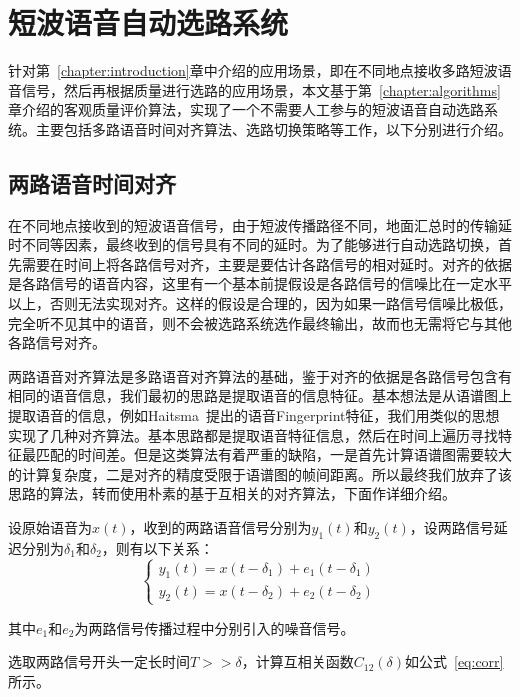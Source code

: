 \chapter{短波语音自动选路系统}
\label{chapter:switching}

针对第~\ref{chapter:introduction}章中介绍的应用场景，即在不同地点接收多路短波语音信号，然后再根据质量进行选路的应用场景，本文基于第~\ref{chapter:algorithms}章介绍的客观质量评价算法，实现了一个不需要人工参与的短波语音自动选路系统。主要包括多路语音时间对齐算法、选路切换策略等工作，以下分别进行介绍。

\section{两路语音时间对齐}\label{section:align2}

在不同地点接收到的短波语音信号，由于短波传播路径不同，地面汇总时的传输延时不同等因素，最终收到的信号具有不同的延时。为了能够进行自动选路切换，首先需要在时间上将各路信号对齐，主要是要估计各路信号的相对延时。对齐的依据是各路信号的语音内容，这里有一个基本前提假设是各路信号的信噪比在一定水平以上，否则无法实现对齐。这样的假设是合理的，因为如果一路信号信噪比极低，完全听不见其中的语音，则不会被选路系统选作最终输出，故而也无需将它与其他各路信号对齐。

两路语音对齐算法是多路语音对齐算法的基础，鉴于对齐的依据是各路信号包含有相同的语音信息，我们最初的思路是提取语音的信息特征。基本想法是从语谱图上提取语音的信息，例如Haitsma~\cite{haitsma2002highly}提出的语音Fingerprint特征，我们用类似的思想实现了几种对齐算法。基本思路都是提取语音特征信息，然后在时间上遍历寻找特征最匹配的时间差。但是这类算法有着严重的缺陷，一是首先计算语谱图需要较大的计算复杂度，二是对齐的精度受限于语谱图的帧间距离。所以最终我们放弃了该思路的算法，转而使用朴素的基于互相关的对齐算法，下面作详细介绍。

设原始语音为$x(t)$，收到的两路语音信号分别为$y_1(t)$和$y_2(t)$，设两路信号延迟分别为$\delta_1$和$\delta_2$，则有以下关系：
\begin{equation}
\left\{
    \begin{array}{l}
        y_1(t) = x(t-\delta_1) + e_1(t-\delta_1) \\
        y_2(t) = x(t-\delta_2) + e_2(t-\delta_2)
    \end{array}
\right.
\end{equation}

其中$e_1$和$e_2$为两路信号传播过程中分别引入的噪音信号。

选取两路信号开头一定长时间$T>>\delta$，计算互相关函数$C_{12}(\delta)$如公式~\ref{eq:corr}所示。

